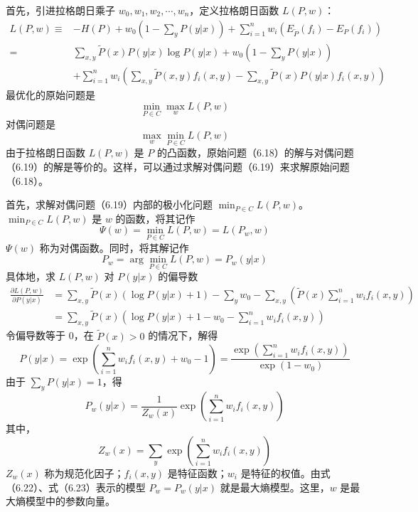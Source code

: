\documentclass[UTF8, 12pt, fontset=fandol, oneside]{ctexart}
\begin{document}
首先，引进拉格朗日乘子 $w_0,w_1,w_2,\cdots,w_n$，定义拉格朗日函数 $L(P,w)$：
\begin{equation}
\begin{aligned}
L(P,w)\equiv{}& -H(P)+w_0\left(1-\sum_y P(y|x)\right)+\sum_{i=1}^n w_i\left(E_{\tilde{P}}(f_i)-E_P(f_i)\right)\\
={}& \sum_{x,y}\tilde{P}(x)P(y|x)\log P(y|x)+w_0\left(1-\sum_y P(y|x)\right)\\
&+\sum_{i=1}^n w_i\left(\sum_{x,y}\tilde{P}(x,y)f_i(x,y)-\sum_{x,y}\tilde{P}(x)P(y|x)f_i(x,y)\right)
\end{aligned}
\tag{6.17}
\end{equation}
最优化的原始问题是
\begin{equation}
\min_{P\in C}\max_w L(P,w)
\tag{6.18}
\end{equation}
对偶问题是
\begin{equation}
\max_w\min_{P\in C}L(P,w)
\tag{6.19}
\end{equation}
由于拉格朗日函数 $L(P,w)$ 是 $P$ 的凸函数，原始问题（6.18）的解与对偶问题（6.19）的解是等价的。这样，可以通过求解对偶问题（6.19）来求解原始问题（6.18）。

首先，求解对偶问题（6.19）内部的极小化问题 $\min_{P\in C}L(P,w)$。$\min_{P\in C}L(P,w)$ 是 $w$ 的函数，将其记作
\begin{equation}
\Psi(w)=\min_{P\in C}L(P,w)=L(P_w,w)
\tag{6.20}
\end{equation}
$\Psi(w)$ 称为对偶函数。同时，将其解记作
\begin{equation}
P_w=\arg\min_{P\in C}L(P,w)=P_w(y|x)
\tag{6.21}
\end{equation}
具体地，求 $L(P,w)$ 对 $P(y|x)$ 的偏导数
\[
\begin{aligned}
\frac{\partial L(P,w)}{\partial P(y|x)}
&=\sum_{x,y}\tilde{P}(x)(\log P(y|x)+1)-\sum_y w_0-\sum_{x,y}\left(\tilde{P}(x)\sum_{i=1}^n w_i f_i(x,y)\right)\\
&=\sum_{x,y}\tilde{P}(x)\left(\log P(y|x)+1-w_0-\sum_{i=1}^n w_i f_i(x,y)\right)
\end{aligned}
\]
令偏导数等于 0，在 $\tilde{P}(x)>0$ 的情况下，解得
\[
P(y|x)=\exp\left(\sum_{i=1}^n w_i f_i(x,y)+w_0-1\right)
=\frac{\exp\left(\sum_{i=1}^n w_i f_i(x,y)\right)}{\exp(1-w_0)}
\]
由于 $\sum_y P(y|x)=1$，得
\begin{equation}
P_w(y|x)=\frac{1}{Z_w(x)}\exp\left(\sum_{i=1}^n w_i f_i(x,y)\right)
\tag{6.22}
\end{equation}
其中，
\begin{equation}
Z_w(x)=\sum_y\exp\left(\sum_{i=1}^n w_i f_i(x,y)\right)
\tag{6.23}
\end{equation}
$Z_w(x)$ 称为规范化因子；$f_i(x,y)$ 是特征函数；$w_i$ 是特征的权值。由式（6.22）、式（6.23）表示的模型 $P_w=P_w(y|x)$ 就是最大熵模型。这里，$w$ 是最大熵模型中的参数向量。
\end{document}
